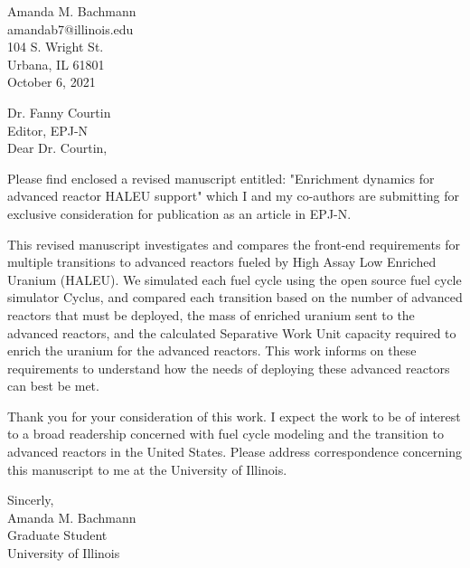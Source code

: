\documentclass{letter}
\newenvironment{texto}[1][\textwidth]{
   \begin{center} %
   \begin{minipage}[t]{#1}
   \raggedright %
}{
  \end{minipage}
   \end{center}
}
\begin{document}
\BgThispage
\clearpage
\begin{flushright}
    Amanda M. Bachmann\\
    amandab7@illinois.edu\\
    104 S. Wright St.\\
    Urbana, IL 61801\\

    October 6, 2021
\end{flushright}

Dr. Fanny Courtin\\
Editor, EPJ-N \\

Dear Dr. Courtin,

Please find enclosed a revised manuscript entitled: "Enrichment dynamics 
for advanced reactor HALEU support" which I and my co-authors are 
submitting for exclusive consideration for publication as an article 
in EPJ-N. 

This revised manuscript investigates and compares the front-end requirements
for multiple transitions to advanced reactors fueled by High Assay Low Enriched 
Uranium (HALEU). We simulated each fuel cycle using the open source fuel cycle 
simulator Cyclus, and compared each transition based on the number of advanced 
reactors that must be deployed, the mass of enriched uranium sent to the 
advanced reactors, and the calculated Separative Work Unit capacity required 
to enrich the uranium for the advanced reactors. This work informs on these 
requirements to understand how the needs of deploying these advanced reactors 
can best be met. 


Thank you for your consideration of this work. I expect the work to be 
of interest to a broad readership concerned with fuel cycle modeling and 
the transition to advanced reactors in the United States. Please 
address correspondence concerning this manuscript to me at the University 
of Illinois.

\begin{texto}[5cm]
    Sincerly, \\
    Amanda M. Bachmann\\
    Graduate Student\\
    University of Illinois\\
    
\end{texto}
\end{document}
